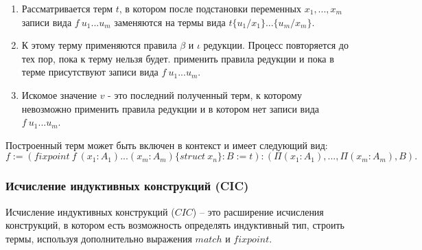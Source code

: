 \documentclass[12pt]{article}
\begin{document}
\begin{enumerate}
 \item Рассматривается терм $t$, в котором после подстановки переменных $x_1,...,x_m$ записи вида $f\ u_1...u_m$ заменяются на термы вида $t\{u_1/x_1\}...\{u_m/x_m\}$.
    \item К этому терму применяются правила $\beta$ и $\iota$ редукции. Процесс повторяется до тех пор, пока к терму нельзя будет. применить правила редукции и пока в терме присутствуют записи вида $f\ u_1...u_m$.
    \item Искомое значение $v$ - это последний полученный терм, к которому невозможно применить правила редукции и в котором нет записи вида $f\ u_1...u_m$.
\end{enumerate}

Построенный терм может быть включен в контекст и имеет следующий вид: 
$$f:= (fixpoint\ f\ (x_1:A_1)...(x_m:A_m)\{struct\ x_n\}:B:=t):(\Pi (x_1:A_1),...,\Pi (x_m:A_m), B).$$

\subsubsection{Исчисление индуктивных конструкций (CIC)}
Исчисление индуктивных конструкций ($CIC$) -- это расширение исчисления конструкций\cite{Coquand}, в котором есть возможность определять индуктивный тип, строить термы, используя дополнительно выражения $match$ и $fixpoint$.
\end{document}
